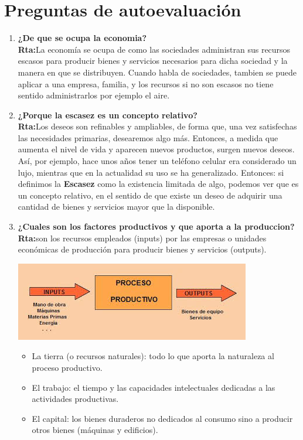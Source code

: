 \documentclass[12pt]{book}
\begin{document}
\section{Preguntas de autoevaluaci\'on}
\begin{enumerate}
\item \textbf{¿De que se ocupa la economia?}
\\
\textbf{Rta:}La economía se ocupa de como las sociedades administran sus recursos escasos para producir bienes y servicios necesarios  para dicha sociedad y la manera en que se distribuyen.
Cuando habla de sociedades, tambien se puede aplicar a una empresa, familia, y los recursos si no son escasos no tiene sentido administrarlos por ejemplo el aire.

\item \textbf{¿Porque la escasez es un concepto relativo?}
\\
\textbf{Rta:}Los deseos son refinables y ampliables, de forma que, una vez satisfechas las necesidades primarias, desearemos algo más. Entonces, a medida que aumenta el nivel de vida y aparecen nuevos productos, surgen nuevos deseos. Así, por ejemplo, hace unos años tener un teléfono celular era considerado un lujo, mientras que en la actualidad su uso se ha generalizado. 
Entonces: si definimos la \textbf{Escasez} como la existencia limitada de algo, podemos ver que es un concepto relativo, en el sentido de que existe un deseo de adquirir una cantidad de bienes y servicios mayor que la disponible.

\item \textbf{¿Cuales son los factores productivos y que aporta a la produccion?}
\\
\textbf{Rta:}son los recursos empleados (inputs) por las empresas o unidades económicas de producción para producir bienes y servicios (outputs).
\begin {center}
\includegraphics[scale=.4]{Proceso.jpeg}
\end {center}

\begin{itemize}
\item La tierra (o recursos naturales): todo lo que aporta la naturaleza al proceso productivo.
\item El trabajo: el tiempo y las capacidades intelectuales dedicadas a las actividades productivas.
\item El capital: los bienes duraderos no dedicados al consumo sino a producir otros bienes (máquinas y edificios).
\end{itemize}


\end{enumerate}
\end{document}
